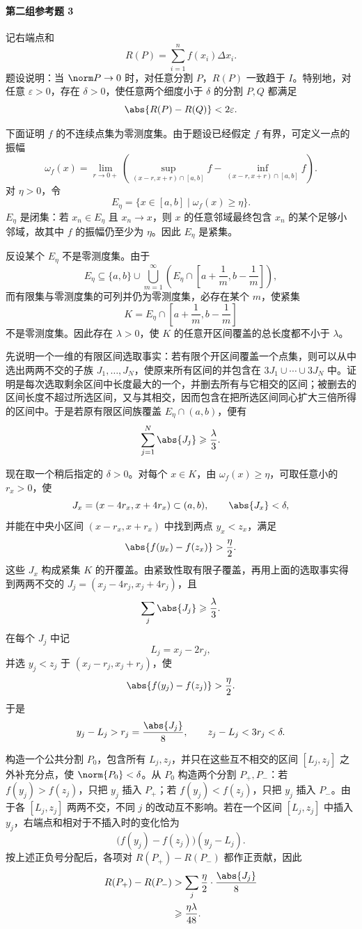 \paragraph{第二组参考题 3}
\begin{xsolution}
记右端点和
\[
  R(P)=\sum_{i=1}^n f(x_i)\Delta x_i.
\]
题设说明：当 $\norm P\to0$ 时，对任意分割 $P$，$R(P)$ 一致趋于 $I$。特别地，对任意 $\varepsilon>0$，存在 $\delta>0$，使任意两个细度小于 $\delta$ 的分割 $P,Q$ 都满足
\[
  \abs{R(P)-R(Q)}<2\varepsilon.
\]

下面证明 $f$ 的不连续点集为零测度集。由于题设已经假定 $f$ 有界，可定义一点的振幅
\[
  \omega_f(x)=\lim_{r\to0+}
  \left(\sup_{(x-r,x+r)\cap[a,b]}f-
  \inf_{(x-r,x+r)\cap[a,b]}f\right).
\]
对 $\eta>0$，令
\[
  E_\eta=\{x\in[a,b]\mid\omega_f(x)\geqslant\eta\}.
\]
$E_\eta$ 是闭集：若 $x_n\in E_\eta$ 且 $x_n\to x$，则 $x$ 的任意邻域最终包含 $x_n$ 的某个足够小邻域，故其中 $f$ 的振幅仍至少为 $\eta$。因此 $E_\eta$ 是紧集。

反设某个 $E_\eta$ 不是零测度集。由于
\[
  E_\eta\subseteq\{a,b\}\cup
  \bigcup_{m=1}^\infty
  \left(E_\eta\cap\left[a+\frac1m,b-\frac1m\right]\right),
\]
而有限集与零测度集的可列并仍为零测度集，必存在某个 $m$，使紧集
\[
  K=E_\eta\cap\left[a+\frac1m,b-\frac1m\right]
\]
不是零测度集。因此存在 $\lambda>0$，使 $K$ 的任意开区间覆盖的总长度都不小于 $\lambda$。

先说明一个一维的有限区间选取事实：若有限个开区间覆盖一个点集，则可以从中选出两两不交的子族 $J_1,\ldots,J_N$，使原来所有区间的并包含在 $3J_1\cup\cdots\cup3J_N$ 中。证明是每次选取剩余区间中长度最大的一个，并删去所有与它相交的区间；被删去的区间长度不超过所选区间，又与其相交，因而包含在把所选区间同心扩大三倍所得的区间中。于是若原有限区间族覆盖 $E_\eta\cap(a,b)$，便有
\[
  \sum_{j=1}^N\abs{J_j}\geqslant\frac\lambda3.
\]

现在取一个稍后指定的 $\delta>0$。对每个 $x\in K$，由 $\omega_f(x)\geqslant\eta$，可取任意小的 $r_x>0$，使
\[
  J_x=(x-4r_x,x+4r_x)\subset(a,b),
  \qquad \abs{J_x}<\delta,
\]
并能在中央小区间 $(x-r_x,x+r_x)$ 中找到两点 $y_x<z_x$，满足
\[
  \abs{f(y_x)-f(z_x)}>\frac\eta2.
\]
这些 $J_x$ 构成紧集 $K$ 的开覆盖。由紧致性取有限子覆盖，再用上面的选取事实得到两两不交的 $J_j=(x_j-4r_j,x_j+4r_j)$，且
\[
  \sum_j\abs{J_j}\geqslant\frac\lambda3.
\]
在每个 $J_j$ 中记
\[
  L_j=x_j-2r_j,
\]
并选 $y_j<z_j$ 于 $(x_j-r_j,x_j+r_j)$，使
\[
  \abs{f(y_j)-f(z_j)}>\frac\eta2.
\]
于是
\[
  y_j-L_j>r_j=\frac{\abs{J_j}}8,
  \qquad
  z_j-L_j<3r_j<\delta.
\]

构造一个公共分割 $P_0$，包含所有 $L_j,z_j$，并只在这些互不相交的区间 $[L_j,z_j]$ 之外补充分点，使 $\norm{P_0}<\delta$。从 $P_0$ 构造两个分割 $P_+,P_-$：若 $f(y_j)>f(z_j)$，只把 $y_j$ 插入 $P_+$；若 $f(y_j)<f(z_j)$，只把 $y_j$ 插入 $P_-$。由于各 $[L_j,z_j]$ 两两不交，不同 $j$ 的改动互不影响。若在一个区间 $[L_j,z_j]$ 中插入 $y_j$，右端点和相对于不插入时的变化恰为
\[
  \bigl(f(y_j)-f(z_j)\bigr)(y_j-L_j).
\]
按上述正负号分配后，各项对 $R(P_+)-R(P_-)$ 都作正贡献，因此
\begin{align*}
  R(P_+)-R(P_-)
  &>\sum_j\frac\eta2\cdot\frac{\abs{J_j}}8\\
  &\geqslant\frac{\eta\lambda}{48}.
\end{align*}


\end{xsolution}
